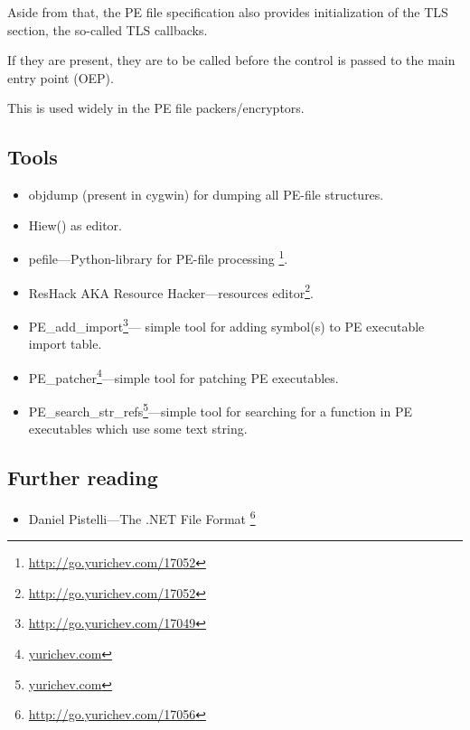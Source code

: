 Aside from that, the PE file specification also provides initialization of the
\ac{TLS} section, the so-called TLS callbacks.

If they are present, they are to be called before the control is passed to the main entry point (\ac{OEP}).

This is used widely in the PE file packers/encryptors.

\subsection{Tools}

\label{ResHack}

\begin{itemize}
\item objdump (present in cygwin) for dumping all PE-file structures.

\item Hiew() as editor.

\item pefile---Python-library for PE-file processing \footnote{\url{http://go.yurichev.com/17052}}.

\item ResHack \acs{AKA} Resource Hacker---resources editor\footnote{\url{http://go.yurichev.com/17052}}.

\item PE\_add\_import\footnote{\url{http://go.yurichev.com/17049}}---
simple tool for adding symbol(s) to PE executable import table.

\item PE\_patcher\footnote{\href{http://go.yurichev.com/17054}{yurichev.com}}---simple tool for patching PE executables.

\item PE\_search\_str\_refs\footnote{\href{http://go.yurichev.com/17055}{yurichev.com}}---simple tool for searching for a function in PE executables which use some text string.
\end{itemize}

\subsection{Further reading}

\begin{itemize}
\item Daniel Pistelli---The .NET File Format \footnote{\url{http://go.yurichev.com/17056}}
\end{itemize}

